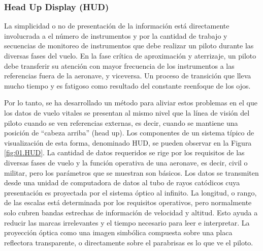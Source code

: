 

\subsubsection{Head Up Display (HUD)}
\label{sec:HUD}
  
La simplicidad o no de presentaci\'on de la informaci\'on est\'a directamente involucrada a el número de instrumentos  y por la cantidad de trabajo y secuencias de monitoreo de instrumentos que debe realizar un piloto durante las diversas fases del vuelo. En la fase crítica de aproximación y aterrizaje, un piloto debe transferir su atención con mayor frecuencia de los instrumentos a las referencias fuera de la aeronave, y viceversa. Un proceso de transición que lleva mucho tiempo y es fatigoso como resultado del constante reenfoque de los ojos.

Por lo tanto, se ha desarrollado un método para aliviar estos problemas en el que los datos de vuelo vitales se presentan al mismo nivel que la línea de visión del piloto cuando se ven referencias externas, es decir, cuando se mantiene una posición de ``cabeza arriba'' (head up). Los componentes de un sistema típico de visualización de esta forma, denominado \ac{HUD}, se pueden observar en la Figura \ref{fig:01.HUD}. 
La cantidad de datos requeridos se rige por los requisitos de las diversas fases de vuelo y la función operativa de una aeronave, es decir, civil o militar, pero los  parámetros que se muestran son básicos. Los datos se transmiten desde una unidad de computadora de datos al tubo de rayos catódicos  cuya presentación es proyectada por el sistema óptico al infinito. La longitud, o rango, de las escalas está determinada por los requisitos operativos, pero normalmente solo cubren bandas estrechas de información de velocidad y altitud. Esto ayuda a reducir las marcas irrelevantes y el tiempo necesario para leer e interpretar. La  proyecci\'on óptica como una imagen simbólica compuesta sobre una placa reflectora transparente, o directamente sobre el parabrisas es lo que ve el piloto. %

